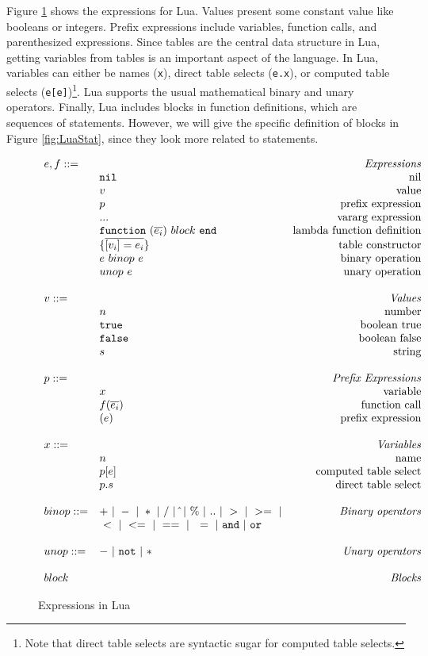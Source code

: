 Figure \ref{fig:LuaExp} shows the expressions for Lua.
Values present some constant value like booleans or integers.
Prefix expressions include variables, function calls, and parenthesized expressions.
Since tables are the central data structure in Lua, getting variables from tables is an important aspect of the language. In Lua, variables can either be names ({\tt x}), direct table selects ({\tt e.x}), or computed table selects ({\tt e[e]})\footnote{Note that direct table selects are syntactic sugar for computed table selects.}. Lua supports the usual mathematical binary and unary operators. Finally, Lua includes blocks in function definitions, which are sequences of statements. However, we will give the specific definition of blocks in Figure \ref{fig:LuaStat}, since they look more related to statements.



\begin{figure}
\caption{Expressions in Lua}
\label{fig:LuaExp}
\[
\begin{array}{llr}
\mydefhead{e,f ::=\qquad\qquad\qquad\qquad}{Expressions}
\mydefcase{\tt nil}{nil}
\mydefcase{v}{value}
\mydefcase{p}{prefix expression}
\mydefcase{\tt ...}{vararg expression}
\mydefcase{\functiondef e {block}}{lambda function definition}
\mydefcase{\{\overline{[v_i] = e_i}\}}{table constructor}
\mydefcase{e ~binop~ e}{binary operation}
\mydefcase{unop~ e}{unary operation}
\\
\mydefhead{v ::=\qquad\qquad\qquad\qquad}{Values}
\mydefcase{n}{number}
\mydefcase{\tt true}{boolean true}
\mydefcase{\tt false}{boolean false}
\mydefcase{s}{string}
\\
\mydefhead{p ::=\qquad\qquad\qquad\qquad}{Prefix Expressions}
\mydefcase{x}{variable}
\mydefcase{f(\overline{e_i})}{function call}
\mydefcase{(e)}{prefix expression}
\\
\mydefhead{x ::=\qquad\qquad\qquad\qquad}{Variables}
\mydefcase{n}{name}
\mydefcase{p[e]}{computed table select}
\mydefcase{p.s}{direct table select}
\\
binop ::= & + ~|~ - ~|~ * ~|~ / ~|~ \hat{} ~|~ \% ~|~ .. ~|~ > ~|~ >= ~|& \mbox{\emph{Binary operators}}\\
\quad & ~ < ~|~ <= ~|~ == ~|~ ~= ~|~ {\tt and} ~|~ {\tt or} & \\
\\
unop ::= & - ~|~ {\tt not} ~|~ * & \mbox{\emph{Unary operators}} \\
\\
\mydefhead{block \qquad\qquad\qquad\qquad}{Blocks}
\end{array}
\]
\end{figure}



